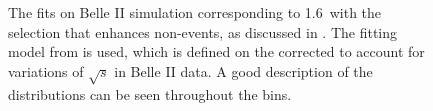 \begin{figure}[htbp!]
{    }
    \caption{\label{fig:mbc_bbar_ehnhanced_fits_mc}
    The fits on Belle II simulation corresponding to 1.6~\invab with the selection 
    that enhances non-\BtoXsgamma events, as discussed in .
    The fitting model from  is used,
    which is defined on the corrected \Mbc to account for variations of $\sqrt{s}$ in Belle II data.
    A good description of the \Mbc distributions can be seen throughout the \EB bins.
    }
\end{figure}

